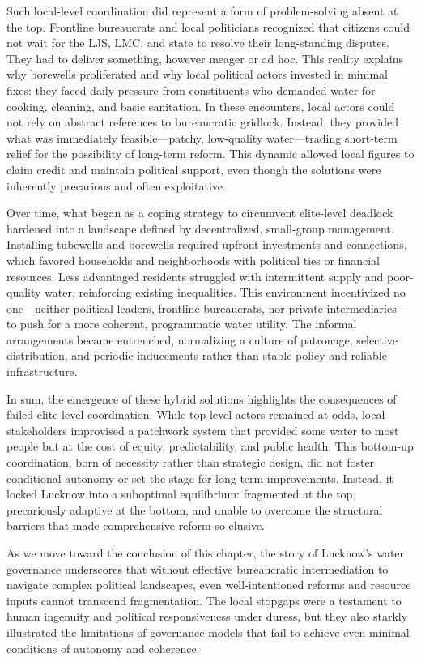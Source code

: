 Such local-level coordination did represent a form of problem-solving absent at the top. Frontline bureaucrats and local politicians recognized that citizens could not wait for the LJS, LMC, and state to resolve their long-standing disputes. They had to deliver something, however meager or ad hoc. This reality explains why borewells proliferated and why local political actors invested in minimal fixes: they faced daily pressure from constituents who demanded water for cooking, cleaning, and basic sanitation. In these encounters, local actors could not rely on abstract references to bureaucratic gridlock. Instead, they provided what was immediately feasible—patchy, low-quality water—trading short-term relief for the possibility of long-term reform. This dynamic allowed local figures to claim credit and maintain political support, even though the solutions were inherently precarious and often exploitative.

Over time, what began as a coping strategy to circumvent elite-level deadlock hardened into a landscape defined by decentralized, small-group management. Installing tubewells and borewells required upfront investments and connections, which favored households and neighborhoods with political ties or financial resources. Less advantaged residents struggled with intermittent supply and poor-quality water, reinforcing existing inequalities. This environment incentivized no one—neither political leaders, frontline bureaucrats, nor private intermediaries—to push for a more coherent, programmatic water utility. The informal arrangements became entrenched, normalizing a culture of patronage, selective distribution, and periodic inducements rather than stable policy and reliable infrastructure.

In sum, the emergence of these hybrid solutions highlights the consequences of failed elite-level coordination. While top-level actors remained at odds, local stakeholders improvised a patchwork system that provided some water to most people but at the cost of equity, predictability, and public health. This bottom-up coordination, born of necessity rather than strategic design, did not foster conditional autonomy or set the stage for long-term improvements. Instead, it locked Lucknow into a suboptimal equilibrium: fragmented at the top, precariously adaptive at the bottom, and unable to overcome the structural barriers that made comprehensive reform so elusive.

As we move toward the conclusion of this chapter, the story of Lucknow’s water governance underscores that without effective bureaucratic intermediation to navigate complex political landscapes, even well-intentioned reforms and resource inputs cannot transcend fragmentation. The local stopgaps were a testament to human ingenuity and political responsiveness under duress, but they also starkly illustrated the limitations of governance models that fail to achieve even minimal conditions of autonomy and coherence.

